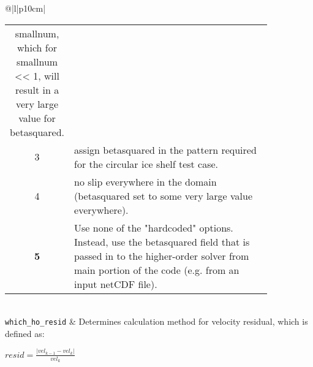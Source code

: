\begin{center}
\begin{supertabular*}{\textwidth}{@{\extracolsep{\fill}}|l|p{10cm}|}
\begin{tabular}[t]{cp{0.85\linewidth}}
          smallnum, which for smallnum << 1, will result in a very large value
          for betasquared.\\
      3 & assign betasquared in the pattern required for the circular ice
          shelf test case.\\
      4 & no slip everywhere in the domain (betasquared set to some very
          large value everywhere).\\
      {\bf 5} & Use none of the "hardcoded" options. Instead, use the betasquared
          field that is passed in to the higher-order solver from main portion
          of the code (e.g. from an input netCDF file).\\
    \end{tabular}\\  
    \hline
    \texttt{which\_ho\_resid} &
    Determines calculation method for velocity residual, which is defined as:

    $resid = \frac{|vel_{k-1} - vel_k|}{vel_k}$


\end{supertabular*}
\end{center}
